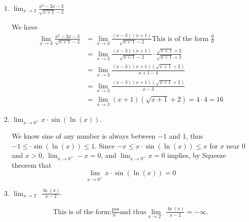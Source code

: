 \documentclass[nooutcomes]{ximera}
\begin{document}
\begin{problem}
	\begin{enumerate}
  \item
      $\displaystyle \lim_{x \to 3} \frac{x^2 - 2x - 3}{\sqrt{x+1} - 2}$
      \begin{freeResponse}
        We have
        \begin{align*}
          \lim_{x \to 3} \frac{x^2 - 2x - 3}{\sqrt{x+1} - 2} &= \lim_{x \to 3} \frac{(x- 3)(x + 1)}{\sqrt{x+1} - 2} \text{This is of the form $\frac{0}{0}$} \\
          &= \lim_{x \to 3} \frac{(x- 3)(x + 1)}{\sqrt{x+1} - 2} \cdot \frac{\sqrt{x+1} + 2}{\sqrt{x+1} + 2}\\
          &= \lim_{x \to 3} \frac{(x- 3)(x + 1)(\sqrt{x+1} + 2)}{x+1 - 4}\\
          &= \lim_{x \to 3} \frac{(x- 3)(x + 1)(\sqrt{x+1} + 2)}{x-3}\\
          &= \lim_{x \to 3} (x + 1)(\sqrt{x+1} + 2) = 4 \cdot 4 = 16
        \end{align*}
      \end{freeResponse}


    \item
      $\displaystyle \lim_{x \to 0^+} x \cdot \sin(\ln(x))$.
      \begin{freeResponse}
	We know sine of any number is always between $-1$ and $1$, thus $-1 \le  \cdot \sin(\ln(x)) \le 1$.
        Since $-x \le x \cdot \sin(\ln(x)) \le x$ for $x$ near $0$ and $x>0$, $\lim_{x \to 0^+} -x = 0$, and $\lim_{x \to 0^+} x = 0$ implies, by Squeeze theorem that
        \[
          \lim_{x \to 0^+} x \cdot \sin(\ln(x)) = 0
        \]
      \end{freeResponse}


    \item
      $\displaystyle \lim_{x \to 2^-} \frac{\ln(x)}{x - 2}$.
      \begin{freeResponse}
       
        \begin{align*}
        	\text{This is of the form:}\frac{\text{pos}}{0^-} \text{and thus} \lim_{x \to 2^-} \frac{\ln(x)}{x - 2} = -\infty.
        \end{align*}
      \end{freeResponse}
  \end{enumerate} 
\end{problem}
\end{document}
